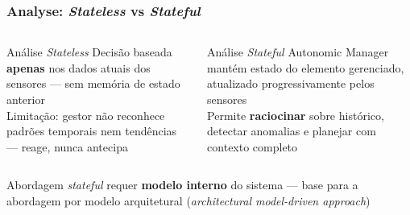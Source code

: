 \documentclass{beamer}
\begin{document}
  \begin{frame}
    \frametitle{Analyse: \textit{Stateless} vs \textit{Stateful}}
    \begin{columns}
      \begin{alertblock}{Análise \textit{Stateless}}
        \footnotesize
        Decisão baseada \textbf{apenas} nos dados atuais dos sensores --- sem memória de estado anterior\\[0.2cm]
        Limitação: gestor não reconhece padrões temporais nem tendências --- reage, nunca antecipa
      \end{alertblock}
      \begin{block}{Análise \textit{Stateful}}
        \footnotesize
        Autonomic Manager mantém estado do elemento gerenciado, atualizado progressivamente pelos sensores\\[0.2cm]
        Permite \textbf{raciocinar} sobre histórico, detectar anomalias e planejar com contexto completo
      \end{block}
    \end{columns}
    \vspace{0.3cm}
    \begin{block}{}
      \footnotesize
      Abordagem \textit{stateful} requer \textbf{modelo interno} do sistema --- base para a abordagem por modelo arquitetural (\textit{architectural model-driven approach})
    \end{block}
  \end{frame}
\end{document}
